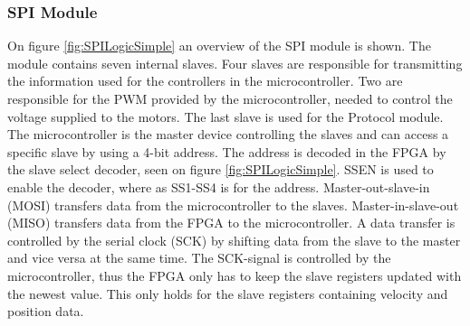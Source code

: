 \documentclass[../../main.tex]{subfiles}
\begin{document}





\subsubsection*{SPI Module}

On figure \ref{fig:SPILogicSimple} an overview of the SPI module is shown. The module contains seven internal slaves. Four slaves are responsible for transmitting the information used for the controllers in the microcontroller. Two are responsible for the PWM provided by the microcontroller, needed to control the voltage supplied to the motors. The last slave is used for the Protocol module. The microcontroller is the master device controlling the slaves and can access a specific slave by using a 4-bit address. The address is decoded in the FPGA by the slave select decoder, seen on figure \ref{fig:SPILogicSimple}. SSEN is used to enable the decoder, where as SS1-SS4 is for the address. Master-out-slave-in (MOSI) transfers data from the microcontroller to the slaves. Master-in-slave-out (MISO) transfers data from the FPGA to the microcontroller. A data transfer is controlled by the serial clock (SCK) by shifting data from the slave to the master and vice versa at the same time. The SCK-signal is controlled by the microcontroller, thus the FPGA only has to keep the slave registers updated with the newest value. This only holds for the slave registers containing velocity and position data. 





\end{document}
